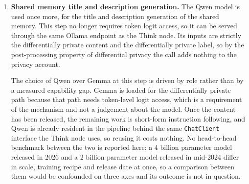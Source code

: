 \begin{enumerate}
    The sole deviation of substance from the \citet{amin2024private} paper is
    that it uses Gemma 1.1 2B IT, whereas this thesis uses the more recent
    Gemma 2 2B IT \citep{gemmateam2024gemma2}. This choice may affect the
    hyperparameters, since the values the paper reports were tuned on the
    earlier model, and the values used here are given in Table
    \ref{tab:dp-hyperparameters} below.

    Gemma 2 2B IT was chosen over the Gemma 2 2B base model for two reasons.
    First, it has been instruction-tuned, meaning further trained on tasks
    phrased as natural-language instructions \citep{wei2022finetuned}, so
    inputs must be arranged into the model-specific chat template. Second, in
    the intermediate experiments reported in Section \ref{intermediate results},
    Gemma 2 2B IT under the chat template produced lessons that fitted the
    input memory items better than the base model under raw completion. That
    comparison was a single qualitative pass over a ten-item fixture, with the
    model and the prompting regime varied together, so it is reported as the
    reason the project standardised on the IT variant rather than as a measured
    result.

    The model is loaded in \texttt{torch.bfloat16} rather than fp32 or fp16.
    Gemma 2 applies logit soft-capping in each attention layer and in the final
    layer \citep{gemmateam2024gemma2}, and fp16's narrower exponent range
    produces silent NaN and Inf values there, while fp32 was too slow on MPS.
    bfloat16 is the model's training dtype and preserves the fp32 dynamic range
    at roughly half the per-forward cost.

    \item \textbf{Shared memory title and description generation.} The Qwen
    model is used once more, for the title and description generation of the
    shared memory. This step no longer requires token logit access, so it can
    be served through the same Ollama endpoint as the Think node. Its inputs
    are strictly the differentially private content and the differentially
    private label, so by the post-processing property of differential privacy
    the call adds nothing to the privacy account.

    The choice of Qwen over Gemma at this step is driven by role rather than by
    a measured capability gap. Gemma is loaded for the differentially private
    path because that path needs token-level logit access, which is a
    requirement of the mechanism and not a judgement about the model. Once the
    content has been released, the remaining work is short-form instruction
    following, and Qwen is already resident in the pipeline behind the same
    \texttt{ChatClient} interface the Think node uses, so reusing it costs
    nothing. No head-to-head benchmark between the two is reported here: a 4
    billion parameter model released in 2026 and a 2 billion parameter model
    released in mid-2024 differ in scale, training recipe and release date at
    once, so a comparison between them would be confounded on three axes and
    its outcome is not in question.
\end{enumerate}


